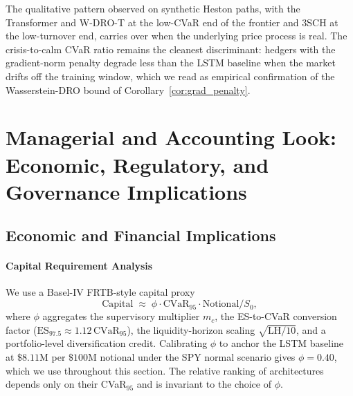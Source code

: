 \documentclass[11pt,oneside]{report}
\begin{document}

The qualitative pattern observed on synthetic Heston paths, with the Transformer and W-DRO-T at the low-CVaR end of the frontier and 3SCH at the low-turnover end, carries over when the underlying price process is real. The crisis-to-calm CVaR ratio remains the cleanest discriminant: hedgers with the gradient-norm penalty degrade less than the LSTM baseline when the market drifts off the training window, which we read as empirical confirmation of the Wasserstein-DRO bound of Corollary~\ref{cor:grad_penalty}.


\chapter{Managerial and Accounting Look: Economic, Regulatory, and Governance Implications}
\label{sec:economic}

\section{Economic and Financial Implications}

\subsubsection{Capital Requirement Analysis}

We use a Basel-IV FRTB-style capital proxy
\begin{equation}
\mathrm{Capital} \;\approx\; \phi\cdot\mathrm{CVaR}_{95}\cdot\mathrm{Notional}/S_0,
\label{eq:capital_proxy}
\end{equation}
where $\phi$ aggregates the supervisory multiplier $m_c$, the ES-to-CVaR conversion factor ($\mathrm{ES}_{97.5}\approx 1.12\,\mathrm{CVaR}_{95}$), the liquidity-horizon scaling $\sqrt{\mathrm{LH}/10}$, and a portfolio-level diversification credit.  Calibrating $\phi$ to anchor the LSTM baseline at $\$8.11$M per $\$100$M notional under the SPY normal scenario gives $\phi = 0.40$, which we use throughout this section.  The relative ranking of architectures depends only on their CVaR$_{95}$ and is invariant to the choice of $\phi$.
\end{document}
